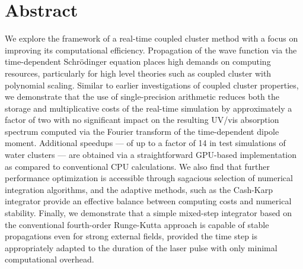 
\section*{Abstract} \label{abstract}

We explore the framework of a real-time coupled cluster method with a focus on
improving its computational efficiency.  Propagation of the wave function via the
time-dependent Schr\"odinger equation places high demands on computing resources,
particularly for high level theories such as coupled cluster with polynomial scaling.
Similar to earlier investigations of coupled cluster properties, we demonstrate that
the use of single-precision arithmetic reduces both the storage and multiplicative
costs of the real-time simulation by approximately a factor of two with no significant
impact on the resulting UV/vis absorption spectrum computed via the Fourier transform
of the time-dependent dipole moment.  Additional speedups --- of up to a factor of 14
in test simulations of water clusters --- are obtained via a straightforward GPU-based
implementation as compared to conventional CPU calculations.  We also find that
further performance optimization is accessible through sagacious selection of
numerical integration algorithms, and the adaptive methods, such as the Cash-Karp
integrator provide an effective balance between computing costs and numerical
stability.  Finally, we demonstrate that a simple mixed-step integrator based on the
conventional fourth-order Runge-Kutta approach is capable of stable propagations even
for strong external fields, provided the time step is appropriately adapted to the
duration of the laser pulse with only minimal computational overhead.
